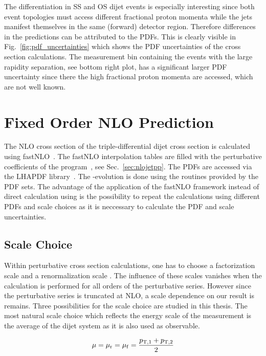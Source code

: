 The differentiation in SS and OS dijet events is especially interesting since
both event topologies must access different fractional proton momenta while the
jets manifest themselves in the same (forward) detector region. Therefore
differences in the predictions can be attributed to the PDFs. This is clearly
visible in Fig.~\ref{fig:pdf_uncertainties} which shows the PDF uncertainties of
the cross section calculations. The measurement bin containing the events with
the large rapidity separation, see bottom right plot, has a significant larger
PDF uncertainty since there the high fractional proton momenta are accessed,
which are not well known.

\section{Fixed Order NLO Prediction}

The NLO cross section of the triple-differential dijet cross section is
calculated using fastNLO~\cite{Kluge:2006xs,Britzger:2012bs}. The fastNLO
interpolation tables are filled with the perturbative coefficients of the
\NLOJETPP program~\cite{Nagy:2003tz}, see Sec.~\ref{sec:nlojetpp}. The PDFs are
accessed via the LHAPDF library~\cite{Whalley:2005nh,Buckley:2014ana}. The
\as-evolution is done using the routines provided by the PDF sets. The advantage
of the application of the fastNLO framework instead of direct calculation using
\NLOJETPP is the possibility to repeat the calculations using different PDFs and
scale choices as it is neccessary to calculate the PDF and scale uncertainties.

\subsection{Scale Choice}
\label{sec:scale_coice}

Within perturbative cross section calculations, one has to choose a
factorization scale \muf and a renormalization scale \mur. The influence of these scales vanishes
when the calculation is performed for all orders of the perturbative series.
However since the perturbative series is truncated at NLO, a scale dependence on our result is
remains. Three possibilities for the scale choice are studied in this thesis.
The most natural scale choice which reflects the energy scale of the measurement
is the average \pt of the dijet system as it is also used as observable. 

\begin{equation*}
    \mu = \mu_{\mathrm{r}} = \mu_{\mathrm{f}} = \frac{p_{\mathrm{T},1} + p_{\mathrm{T},2}}{2}
\end{equation*}

